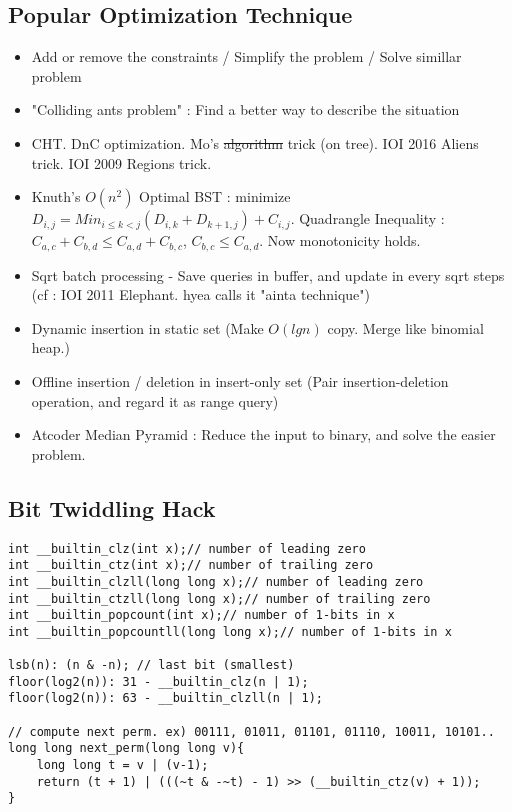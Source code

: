 \documentclass[landscape, 8pt, a4paper, oneside, twocolumn]{extarticle}
\begin{document}
\subsection {Popular Optimization Technique}
\begin{itemize}
	\item Add or remove the constraints / Simplify the problem / Solve simillar problem
	\item "Colliding ants problem" : Find a better way to describe the situation
	\item CHT. DnC optimization. Mo's \sout{algorithm} trick (on tree). IOI 2016 Aliens trick. IOI 2009 Regions trick.
	\item Knuth's $O(n^2)$ Optimal BST : minimize $D_{i, j} = Min_{i \leq k < j}(D_{i, k} + D_{k+1, j}) + C_{i, j}$. Quadrangle Inequality : $C_{a, c} + C_{b, d} \leq C_{a, d} + C_{b, c}$, $C_{b, c} \leq C_{a, d}$. Now monotonicity holds.
	\item Sqrt batch processing - Save queries in buffer, and update in every sqrt steps (cf : IOI 2011 Elephant. hyea calls it "ainta technique")
	\item Dynamic insertion in static set (Make $O(lgn)$ copy. Merge like binomial heap.)
	\item Offline insertion / deletion in insert-only set (Pair insertion-deletion operation, and regard it as range query)
	\item Atcoder Median Pyramid : Reduce the input to binary, and solve the easier problem.
\end{itemize}
\subsection {Bit Twiddling Hack}
\begin{verbatim}
int __builtin_clz(int x);// number of leading zero
int __builtin_ctz(int x);// number of trailing zero
int __builtin_clzll(long long x);// number of leading zero
int __builtin_ctzll(long long x);// number of trailing zero
int __builtin_popcount(int x);// number of 1-bits in x
int __builtin_popcountll(long long x);// number of 1-bits in x

lsb(n): (n & -n); // last bit (smallest)
floor(log2(n)): 31 - __builtin_clz(n | 1);
floor(log2(n)): 63 - __builtin_clzll(n | 1);

// compute next perm. ex) 00111, 01011, 01101, 01110, 10011, 10101..
long long next_perm(long long v){
	long long t = v | (v-1);
	return (t + 1) | (((~t & -~t) - 1) >> (__builtin_ctz(v) + 1));
}
\end{verbatim}
\end{document}

